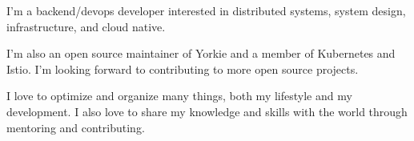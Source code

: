 

\begin{cvparagraph}

I'm a backend/devops developer interested in distributed systems, system design, infrastructure, and cloud native.

I'm also an open source maintainer of Yorkie and a member of Kubernetes and Istio. I'm looking forward to contributing to more open source projects.

I love to optimize and organize many things, both my lifestyle and my development. I also love to share my knowledge and skills with the world through mentoring and contributing.
\end{cvparagraph}
